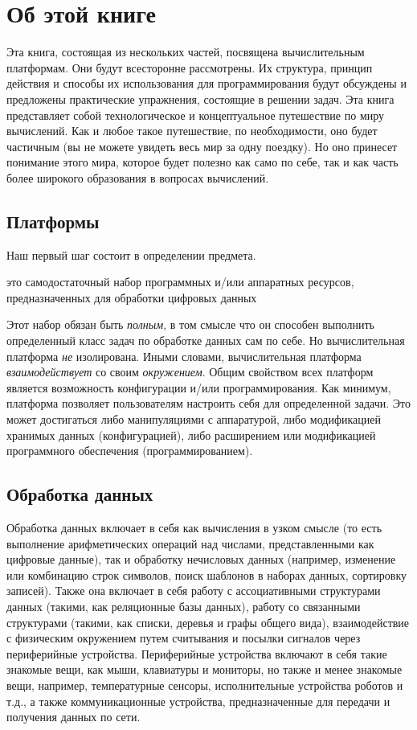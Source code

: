 \chapter{Об этой книге}

Эта книга, состоящая из нескольких частей, посвящена вычислительным платформам.
Они будут всесторонне рассмотрены.  Их структура, принцип действия
и способы их использования для программирования будут обсуждены и предложены практические упражнения, состоящие в решении задач.   
Эта книга представляет собой технологическое и концептуальное путешествие по миру вычислений.  Как и любое такое путешествие, по необходимости, оно будет частичным
(вы не можете увидеть весь мир за одну поездку).  Но оно принесет понимание этого мира,
которое будет полезно как само по себе, так и как часть более широкого образования 
в вопросах вычислений.
  
\section{Платформы}

Наш первый шаг состоит в определении предмета.
\begin{mydef} это самодостаточный набор программных и/или
аппаратных ресурсов, предназначенных для обработки цифровых данных
\end{mydef}

Этот набор обязан быть \emph{полным}, в том смысле что он способен выполнить определенный класс задач по обработке данных сам по себе.  Но вычислительная платформа
\emph{не} изолирована.  Иными словами, вычислительная платформа \emph{взаимодействует} со своим \emph{окружением}.  Общим свойством всех платформ является возможность конфигурации и/или программирования.  Как минимум, платформа
позволяет пользователям настроить себя для определенной задачи.  Это может достигаться
либо манипуляциями с аппаратурой, либо модификацией хранимых данных (конфигурацией), либо расширением или модификацией программного обеспечения (программированием).

\section{Обработка данных}

Обработка данных включает в себя как вычисления в узком смысле (то есть выполнение арифметических операций над числами, представленными как цифровые данные), так и обработку нечисловых данных (например, изменение или комбинацию строк символов, поиск шаблонов в наборах данных, сортировку записей).  Также она включает в себя работу с ассоциативными структурами данных (такими, как реляционные базы данных), работу со связанными структурами (такими, как списки, деревья и графы общего вида), взаимодействие с физическим окружением путем считывания и посылки сигналов через периферийные устройства.  Периферийные устройства включают в себя такие знакомые вещи, как мыши, клавиатуры и мониторы, но также и менее знакомые вещи, например, температурные сенсоры, исполнительные устройства роботов и т.д., а также коммуникационные устройства, предназначенные для передачи и получения данных по сети.

